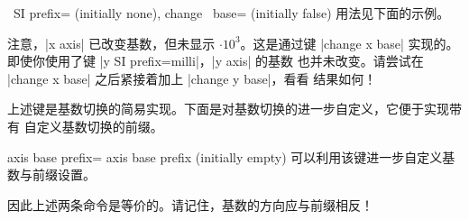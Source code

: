 \begin{pgfplotsxykeylist}{%
    \x\ SI prefix= (initially none),
    change \x\ base= (initially false)%
}
    用法见下面的示例。
\begin{codeexample}[]
\end{codeexample}
    注意，|x axis| 已改变基数，但未显示 $\cdot 10^{3}$。这是通过键
    |change x base| 实现的。即使你使用了键 |y SI prefix=milli|，|y axis| 的基数
    也并未改变。请尝试在 |change x base| 之后紧接着加上 |change y base|，看看
    结果如何！
\end{pgfplotsxykeylist}

上述键是基数切换的简易实现。下面是对基数切换的进一步自定义，它便于实现带有
自定义基数切换的前缀。

\begin{pgfplotskey}{axis base prefix=%
    {axis  base  prefix } (initially empty)%
}
    可以利用该键进一步自定义基数与前缀设置。
\begin{codeexample}
\pgfplotsset{change x base,x SI prefix=kilo}
\end{codeexample}
    因此上述两条命令是等价的。请记住，基数的方向应与前缀相反！
\end{pgfplotskey}
\endgroup
